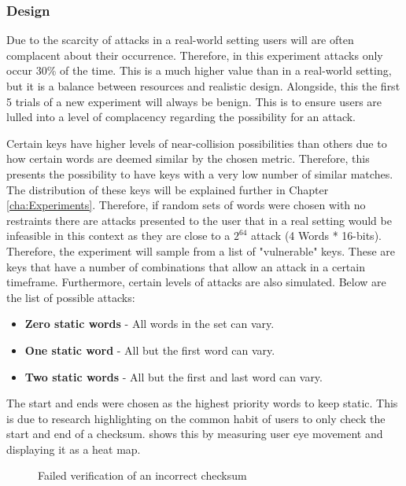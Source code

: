 \subsubsection{Design}

Due to the scarcity of attacks in a real-world setting users will are often complacent about their occurrence. Therefore, in this experiment attacks only occur 30\% of the time. This is a much higher value than in a real-world setting, but it is a balance between resources and realistic design. Alongside, this the first 5 trials of a new experiment will always be benign. This is to ensure users are lulled into a level of complacency regarding the possibility for an attack.

Certain keys have higher levels of near-collision possibilities than others due to how certain words are deemed similar by the chosen metric. Therefore, this presents the possibility to have keys with a very low number of similar matches. The distribution of these keys will be explained further in Chapter \ref{cha:Experiments}. Therefore, if random sets of words were chosen with no restraints there are attacks presented to the user that in a real setting would be infeasible in this context as they are close to a $2^{64}$ attack (4 Words * 16-bits). Therefore, the experiment will sample from a list of "vulnerable" keys. These are keys that have a number of combinations that allow an attack in a certain timeframe. Furthermore, certain levels of attacks are also simulated. Below are the list of possible attacks:

\begin{itemize}
    \item \textbf{Zero static words} - All words in the set can vary.
    \item \textbf{One static word} - All but the first word can vary.
    \item \textbf{Two static words} - All but the first and last word can vary.
\end{itemize}

The start and ends were chosen as the highest priority words to keep static. This is due to research highlighting on the common habit of users to only check the start and end of a checksum. \cite{cherubini2018towards} shows this by measuring user eye movement and displaying it as a heat map.

\begin{figure}[h!]
    \centering
    \caption{Failed verification of an incorrect checksum\cite{cherubini2018towards}}
    \label{fig:heatMap}
\end{figure}

